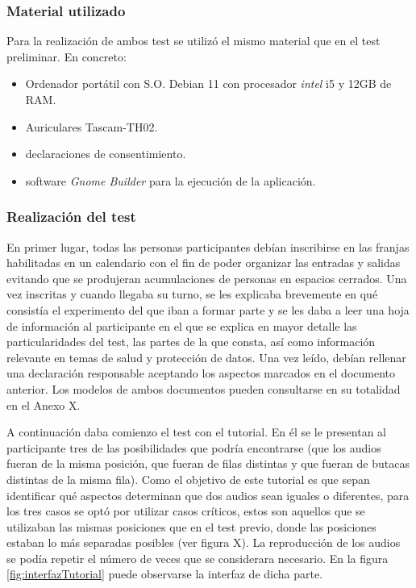 \documentclass[11pt,a4paper,twoside]{book}
\begin{document}
                \subsubsection*{Material utilizado}
                    Para la realización de ambos test se utilizó el mismo material que en el test preliminar. En concreto:
                    \begin{itemize}
                        \item Ordenador portátil con S.O. Debian 11 con procesador \textit{intel} i5 y 12GB de RAM.
                        \item Auriculares Tascam-TH02.
                        \item declaraciones de consentimiento.
                        \item software \textit{Gnome Builder} para la ejecución de la aplicación.
                    \end{itemize}
                
                \subsubsection*{Realización del test}
                    En primer lugar, todas las personas participantes debían inscribirse en las franjas habilitadas en un calendario con el fin de poder organizar las entradas y salidas evitando que se produjeran acumulaciones de personas en espacios cerrados. Una vez inscritas y cuando llegaba su turno, se les explicaba brevemente en qué consistía el experimento del que iban a formar parte y se les daba a leer una hoja de información al participante en el que se explica en mayor detalle las particularidades del test, las partes de la que consta, así como información relevante en temas de salud y protección de datos. Una vez leído, debían rellenar una declaración responsable aceptando los aspectos marcados en el documento anterior. Los modelos de ambos documentos pueden consultarse en su totalidad en el Anexo X.
                
                    A continuación daba comienzo el test con el tutorial. En él se le presentan al participante tres de las posibilidades que podría encontrarse (que los audios fueran de la misma posición, que fueran de filas distintas y que fueran de butacas distintas de la misma fila). Como el objetivo de este tutorial es que sepan identificar qué aspectos determinan que dos audios sean iguales o diferentes, para los tres casos se optó por utilizar casos críticos, estos son aquellos que se utilizaban las mismas posiciones que en el test previo, donde las posiciones estaban lo más separadas posibles (ver figura X). La reproducción de los audios se podía repetir el número de veces que se considerara necesario. En la figura \ref{fig:interfazTutorial} puede observarse la interfaz de dicha parte.
                
\end{document}

